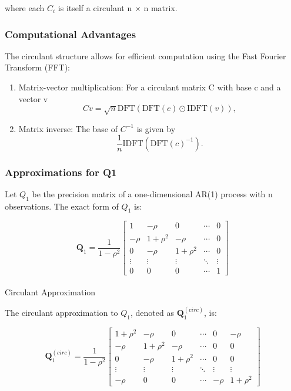 \documentclass[journal=,manuscript=]{achemso}
\makeatletter
\let\oldparagraph\paragraph
\renewcommand{\paragraph}{
    \@ifstar
      \xxxParagraphStar
      \xxxParagraphNoStar
  }
\newcommand{\xxxParagraphStar}[1]{\oldparagraph*{#1}\mbox{}}
\newcommand{\xxxParagraphNoStar}[1]{\oldparagraph{#1}\mbox{}}
\makeatother
\begin{document}
where each \(C_i\) is itself a circulant n × n matrix.

\subsubsection{Computational Advantages}\label{computational-advantages}

The circulant structure allows for efficient computation using the Fast
Fourier Transform (FFT):

\begin{enumerate}
\def\labelenumi{\arabic{enumi}.}
\item
  Matrix-vector multiplication: For a circulant matrix C with base c and
  a vector v \[
  Cv = \sqrt{n} \text{DFT}(\text{DFT}(c) \odot \text{IDFT}(v)),
  \]
\item
  Matrix inverse: The base of \(C^{-1}\) is given by \[
  \frac{1}{n} \text{IDFT}(\text{DFT}(c)^{-1}).
  \]
\end{enumerate}

\subsubsection{Approximations for Q1}\label{approximations-for-q1}

Let \(Q_1\) be the precision matrix of a one-dimensional AR(1) process
with n observations. The exact form of \(Q_1\) is:

\[
\mathbf{Q}_1 = \frac{1}{1-\rho^2}
\begin{bmatrix}
1 & -\rho & 0 & \cdots & 0 \\
-\rho & 1+\rho^2 & -\rho & \cdots & 0 \\
0 & -\rho & 1+\rho^2 & \cdots & 0 \\
\vdots & \vdots & \vdots & \ddots & \vdots \\
0 & 0 & 0 & \cdots & 1
\end{bmatrix}
\]

\paragraph{Circulant Approximation}\label{circulant-approximation}

The circulant approximation to \(Q_1\), denoted as
\(\mathbf{Q}_1^{(circ)}\), is:

\[
\mathbf{Q}_1^{(circ)} = \frac{1}{1-\rho^2}
\begin{bmatrix}
1+\rho^2 & -\rho & 0 & \cdots & 0 & -\rho \\
-\rho & 1+\rho^2 & -\rho & \cdots & 0 & 0 \\
0 & -\rho & 1+\rho^2 & \cdots & 0 & 0 \\
\vdots & \vdots & \vdots & \ddots & \vdots & \vdots \\
-\rho & 0 & 0 & \cdots & -\rho & 1+\rho^2
\end{bmatrix}
\]
\end{document}
